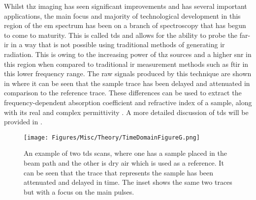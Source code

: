 Whilst \acrshort{thz} imaging has seen significant improvements and has several important applications, the main focus and majority of technological development in this region of the \acrshort{em} spectrum has been on a branch of spectroscopy that has begun to come to maturity. This is called \acrfull{tds} and allows for the ability to probe the far\nobreakdash-\acrshort{ir} in a way that is not possible using traditional methods of generating \acrshort{ir} radiation. This is owing to the increasing power of \acrshort{thz} sources and a higher \acrfull{snr} in this region when compared to traditional \acrshort{ir} measurement methods such as \acrfull{ftir} in this lower frequency range. The raw signals produced by this technique are shown in  where it can be seen that the sample trace has been delayed and attenuated in comparison to the reference trace. These differences can be used to extract the frequency\nobreakdash-dependent absorption coefficient and refractive index of a sample, along with its real and complex permittivity \DIFdelbegin \DIFdel{~}\DIFdelend \cite{Burnett2016}. A more detailed discussion of \acrshort{tds} will be provided in .

\begin{figure}[t]
    \centering
    \texttt{[image: Figures/Misc/Theory/TimeDomainFigureG.png]}
    \captionsetup{font = footnotesize, justification = centering}
    \caption[A Sample and Reference Measurement in the Time Domain]{An example of two \acrshort{tds} scans, where one has a sample placed in the beam path and the other is dry air which is used as a reference. It can be seen that the trace that represents the sample has been attenuated and delayed in time. The inset shows the same two traces but with a focus on the main pulses.}
    \label{fig:exampletd}
\end{figure}

